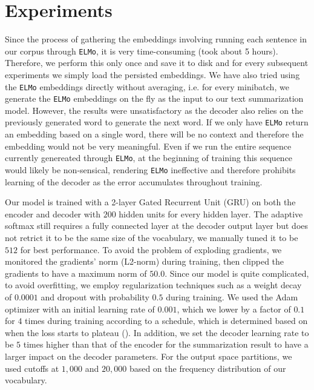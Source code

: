 \section{Experiments}
\label{sec: exp}

Since the process of gathering the embeddings involving running each sentence in our corpus through \texttt{ELMo}, it is very time-consuming (took about 5 hours). Therefore, we perform this only once and save it to disk and for every subsequent experiments we simply load the persisted embeddings. We have also tried using the \texttt{ELMo} embeddings directly without averaging, i.e. for every minibatch, we generate the \texttt{ELMo} embeddings on the fly as the input to our text summarization model. However, the results were unsatisfactory as the decoder also relies on the previously generated word to generate the next word. If we only have \texttt{ELMo} return an embedding based on a single word, there will be no context and therefore the embedding would not be very meaningful. Even if we run the entire sequence currently genereated through \texttt{ELMo}, at the beginning of training this sequence would likely be non-sensical, rendering \texttt{ELMo} ineffective and therefore prohibits learning of the decoder as the error accumulates throughout training.

Our model is trained with a 2-layer Gated Recurrent Unit (GRU) on both the encoder and decoder with $200$ hidden units for every hidden layer. The adaptive softmax still requires a fully connected layer at the decoder output layer but does not retrict it to be the same size of the vocabulary, we manually tuned it to be $512$ for best performance. To avoid the problem of exploding gradients, we monitored the gradients' norm (L2-norm) during training, then clipped the gradients to have a maximum norm of $50.0$. Since our model is quite complicated, to avoid overfitting, we employ regularization techniques such as a weight decay of $0.0001$ and dropout with probability $0.5$ during training. We used the Adam optimizer with an initial learning rate of $0.001$, which we lower by a factor of $0.1$ for $4$ times during training according to a schedule, which is determined based on when the loss starts to plateau (). In addition, we set the decoder learning rate to be $5$ times higher than that of the encoder for the summarization result to have a larger impact on the decoder parameters. For the output space partitions, we used cutoffs at $1,000$ and $20,000$ based on the frequency distribution of our vocabulary. 


